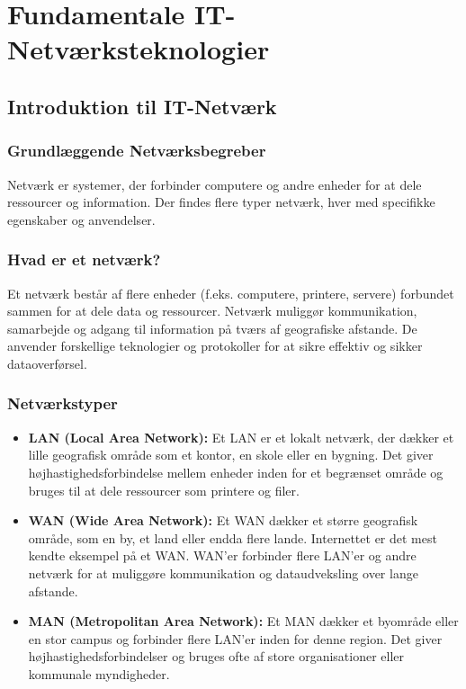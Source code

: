 \part{Fundamentale IT-Netværksteknologier}
\chapter{Introduktion til IT-Netværk}
\label{chapter:Grundlæggende_Netværksteori}
\section{Grundlæggende Netværksbegreber}
Netværk er systemer, der forbinder computere og andre enheder for at dele ressourcer og information. Der findes flere typer netværk, hver med specifikke egenskaber og anvendelser.

\section{Hvad er et netværk?}
Et netværk består af flere enheder (f.eks. computere, printere, servere) forbundet sammen for at dele data og ressourcer. Netværk muliggør kommunikation, samarbejde og adgang til information på tværs af geografiske afstande. De anvender forskellige teknologier og protokoller for at sikre effektiv og sikker dataoverførsel.

\section{Netværkstyper}
\begin{itemize}
	\item \textbf{LAN (Local Area Network):} Et LAN er et lokalt netværk, der dækker et lille geografisk område som et kontor, en skole eller en bygning. Det giver højhastighedsforbindelse mellem enheder inden for et begrænset område og bruges til at dele ressourcer som printere og filer.
	\item \textbf{WAN (Wide Area Network):} Et WAN dækker et større geografisk område, som en by, et land eller endda flere lande. Internettet er det mest kendte eksempel på et WAN. WAN'er forbinder flere LAN'er og andre netværk for at muliggøre kommunikation og dataudveksling over lange afstande.
	\item \textbf{MAN (Metropolitan Area Network):} Et MAN dækker et byområde eller en stor campus og forbinder flere LAN'er inden for denne region. Det giver højhastighedsforbindelser og bruges ofte af store organisationer eller kommunale myndigheder.
\end{itemize}

